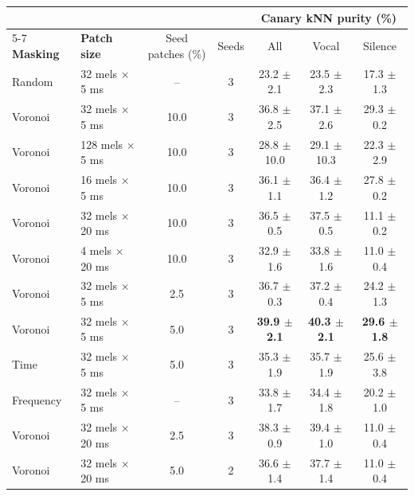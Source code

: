 \noindent

\begin{minipage}{\linewidth}
\label{tab:2}
\noindent %
\par\nopagebreak\vspace{0.5\baselineskip}
\begingroup
\setlength{\tabcolsep}{4pt}
\centering
\small
\begin{tabular*}{\linewidth}{@{\extracolsep{\fill}}llccccc@{}}
\toprule
& & & & \multicolumn{3}{c}{\textbf{Canary kNN purity (\%)}} \\
\cmidrule(lr){5-7}
\textbf{Masking} & \textbf{Patch size} & Seed patches (\%) & Seeds & All & Vocal & Silence \\
\midrule
Random & 32 mels × 5 ms & -- & 3 & 23.2 $\pm$ 2.1 & 23.5 $\pm$ 2.3 & 17.3 $\pm$ 1.3 \\
Voronoi & 32 mels × 5 ms & 10.0 & 3 & 36.8 $\pm$ 2.5 & 37.1 $\pm$ 2.6 & 29.3 $\pm$ 0.2 \\
\addlinespace
Voronoi & 128 mels × 5 ms & 10.0 & 3 & 28.8 $\pm$ 10.0 & 29.1 $\pm$ 10.3 & 22.3 $\pm$ 2.9 \\
Voronoi & 16 mels × 5 ms & 10.0 & 3 & 36.1 $\pm$ 1.1 & 36.4 $\pm$ 1.2 & 27.8 $\pm$ 0.2 \\
Voronoi & 32 mels × 20 ms & 10.0 & 3 & 36.5 $\pm$ 0.5 & 37.5 $\pm$ 0.5 & 11.1 $\pm$ 0.2 \\
Voronoi & 4 mels × 20 ms & 10.0 & 3 & 32.9 $\pm$ 1.6 & 33.8 $\pm$ 1.6 & 11.0 $\pm$ 0.4 \\
\addlinespace
Voronoi & 32 mels × 5 ms & 2.5 & 3 & 36.7 $\pm$ 0.3 & 37.2 $\pm$ 0.4 & 24.2 $\pm$ 1.3 \\
Voronoi & 32 mels × 5 ms & 5.0 & 3 & \textbf{39.9 $\pm$ 2.1} & \textbf{40.3 $\pm$ 2.1} & \textbf{29.6 $\pm$ 1.8} \\
Time & 32 mels × 5 ms & 5.0 & 3 & 35.3 $\pm$ 1.9 & 35.7 $\pm$ 1.9 & 25.6 $\pm$ 3.8 \\
Frequency & 32 mels × 5 ms & -- & 3 & 33.8 $\pm$ 1.7 & 34.4 $\pm$ 1.8 & 20.2 $\pm$ 1.0 \\
\addlinespace
Voronoi & 32 mels × 20 ms & 2.5 & 3 & 38.3 $\pm$ 0.9 & 39.4 $\pm$ 1.0 & 11.0 $\pm$ 0.4 \\
Voronoi & 32 mels × 20 ms & 5.0 & 2 & 36.6 $\pm$ 1.4 & 37.7 $\pm$ 1.4 & 11.0 $\pm$ 0.4 \\
\bottomrule
\end{tabular*}
\endgroup

\end{minipage}
\par\vspace{0.5\baselineskip}
